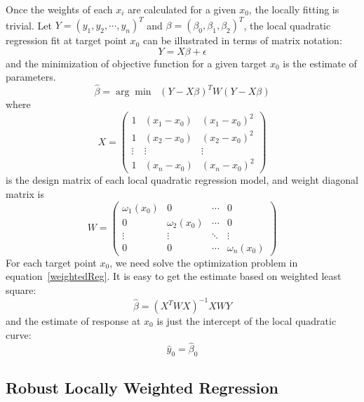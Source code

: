 Once the weights of each $x_i$ are calculated for a given $x_0$, the locally fitting
is trivial. Let $Y=(y_1, y_2, \cdots, y_n)^{T}$ and 
$\beta = (\beta_0, \beta_1, \beta_2)^{T}$, the local quadratic regression fit at
target point $x_0$ can be illustrated in terms of matrix notation:
\begin{equation}
Y = X \beta + \epsilon
\end{equation} 
and the minimization of objective function for a given target $x_0$ is the estimate
of parameters. 
\begin{equation}
\label{weightedReg}
\hat \beta = \arg\min \;\; (Y - X\beta)^TW(Y - X\beta)
\end{equation} 
where
\begin{equation}
X =  
\begin{pmatrix}
  1 & (x_1-x_0) & (x_1-x_0)^2 \\
  1 & (x_2-x_0) & (x_2-x_0)^2 \\
  \vdots  & \vdots & \vdots  \\
  1 & (x_n-x_0) & (x_n-x_0)^2 
\end{pmatrix}
\end{equation} 
is the design matrix of each local quadratic regression model, and weight diagonal
matrix is
\begin{equation}
W =  
\begin{pmatrix}
  \omega_1(x_0) & 0 & \cdots & 0 \\
  0 & \omega_2(x_0) & \cdots & 0 \\
  \vdots  & \vdots & \ddots & \vdots  \\
  0 & 0 & \cdots & \omega_n(x_0) 
\end{pmatrix}
\end{equation} 
For each target point $x_0$, we need solve the optimization problem in 
equation~\ref{weightedReg}. It is easy to get the estimate based on weighted
least square:
\begin{equation}
\hat \beta = (X^TWX)^{-1}XWY
\end{equation}
and the estimate of response at $x_0$ is just the intercept of the local quadratic
curve:
\begin{equation}
\hat y_0 = \hat \beta_0
\end{equation}

\subsection{Robust Locally Weighted Regression}

